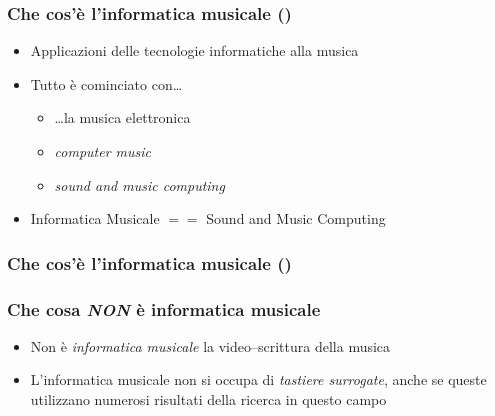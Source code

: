 %
%
% 
% 
% 
%

\setcounter{ms}{0}
\begin{frame}
    \frametitle{Che cos'\`e l'informatica musicale ()}

    \begin{itemize}[<+- | alert@+->]
        \item{Applicazioni delle tecnologie informatiche alla musica}
        \item{Tutto \`e cominciato con\dots}
            \begin{itemize}[<+- | alert@+->]
                \item{\dots la musica elettronica}
                \item{\emph{computer music}}
                \item{\emph{sound and music computing}}
            \end{itemize}
        \item{Informatica Musicale $==$ Sound and Music Computing}
    \end{itemize}
    
\end{frame}

\begin{frame}
    \frametitle{Che cos'\`e l'informatica musicale ()}
    
    \begin{center}
    \end{center}
    
\end{frame}


\setcounter{ms}{0}
\begin{frame}
    \frametitle{Che cosa \emph{NON} \`e informatica musicale}

    \begin{itemize}[<+- | alert@+->]

        \item{Non \`e \emph{informatica musicale} la video--scrittura della musica}

        \item<3->{L'informatica musicale non si occupa di \emph{tastiere
            surrogate}, anche se queste utilizzano numerosi risultati della
            ricerca in questo campo}

    \end{itemize}
    
\end{frame}
